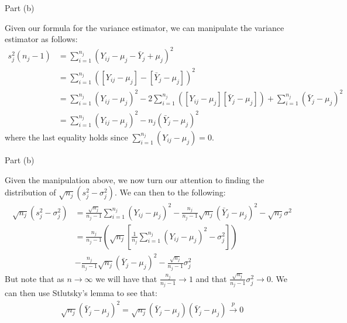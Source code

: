 \begin{frame}{Part (b)}

    Given our formula for the variance estimator, we can manipulate the variance estimator as follows:
    \begin{align*}
        s_j^2 (n_j - 1) &= \sum_{i=1}^{n_j} (Y_{ij} - \mu_j - \bar{Y}_j + \mu_j)^2
        \\
        &= \sum_{i=1}^{n_j} ([Y_{ij} - \mu_j] - [\bar{Y}_j - \mu_j])^2
        \\
        &= \sum_{i=1}^{n_j} (Y_{ij} - \mu_j)^2 - 2 \sum_{i=1}^{n_j}([Y_{ij} - \mu_j][\bar{Y}_j - \mu_j]) + \sum_{i=1}^{n_j} (\bar{Y}_j - \mu_j)^2
        \\
        &= \sum_{i=1}^{n_j} (Y_{ij} - \mu_j)^2  -  n_j (\bar{Y}_j - \mu_j)^2
    \end{align*}
    where the last equality holds since $\sum_{i=1}^{n_j}(Y_{ij} - \mu_j) = 0$.
    
\end{frame}

\begin{frame}{Part (b)}
    
    Given the manipulation above, we now turn our attention to finding the distribution of $\sqrt{n_j}(s_j^2 - \sigma_j^2)$. We can then to the following:
    \begin{align*}
        \sqrt{n_j}(s_j^2 - \sigma_j^2) &= \frac{\sqrt{n_j}}{n_j - 1} \sum_{i=1}^{n_j} (Y_{ij} - \mu_j)^2  - \frac{n_j}{n_j - 1} \sqrt{n_j} (\bar{Y}_j - \mu_j)^2 - \sqrt{n_j} \sigma^2
        \\
        &= \frac{n_j}{n_j - 1} \left( \sqrt{n_j} \left[ \frac{1}{n_j} \sum_{i=1}^{n_j} (Y_{ij} - \mu_j)^2 - \sigma_j^2 \right]  \right)
        \\
        &- \frac{n_j}{n_j - 1} \sqrt{n_j} (\bar{Y}_j - \mu_j)^2 - \frac{\sqrt{n_j}}{n_j - 1}\sigma_j^2 
    \end{align*}
    But note that as $n \rightarrow \infty$ we will have that $\frac{n_j}{n_j - 1} \rightarrow 1$ and that $\frac{\sqrt{n_j}}{n_j - 1} \sigma_j^2 \rightarrow 0$. We can then use Stlutsky's lemma to see that:
    \begin{align*}
        \sqrt{n_j} (\bar{Y}_j - \mu_j)^2 = \sqrt{n_j} (\bar{Y}_j - \mu_j)(\bar{Y}_j - \mu_j) \xrightarrow{p} 0
    \end{align*}
    
\end{frame}

